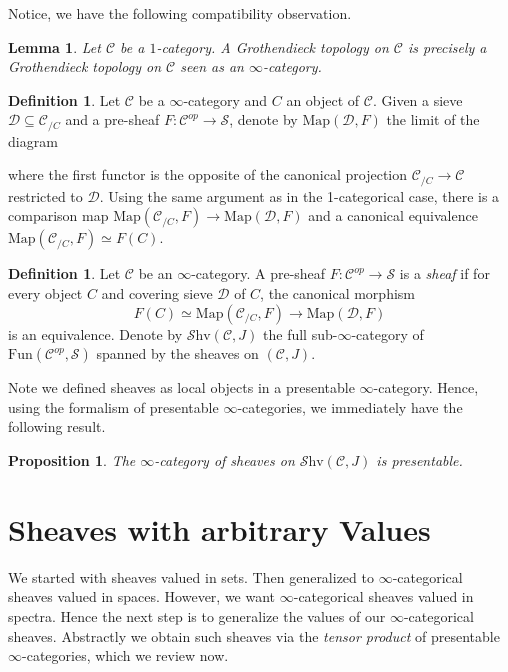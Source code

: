 \documentclass[10pt]{amsart}
\newcommand{\C}{\mathscr{C}}
\newcommand{\D}{\mathscr{D}}
\newcommand{\s}{\mathscr{S}}
\newcommand{\Map}{\mathrm{Map}}
\newcommand{\Fun}{\mathrm{Fun}}
\newcommand{\Shv}{\mathscr{S}\mathrm{hv}}
\newtheorem{lemma}[equation]{Lemma}
\newtheorem{proposition}[equation]{Proposition}
\theoremstyle{definition}
\newtheorem{definition}[equation]{Definition}
\theoremstyle{remark}
\numberwithin{equation}{section}
\begin{document}
	Notice, we have the following compatibility observation.
	\begin{lemma}
		Let $\C$ be a $1$-category. A Grothendieck topology on $\C$ is precisely a Grothendieck topology on $\C$ seen as an $\infty$-category.
	\end{lemma}
	\begin{definition}
		Let $\C$ be a $\infty$-category and $C$ an object of $\C$. Given a sieve $\D\subseteq\C_{/C}$ and a pre-sheaf $F:\C^{op}\to\s$, denote by $\Map(\D,F)$ the limit of the diagram \begin{center}
	\end{center}where the first functor is the opposite of the canonical projection $\C_{/C}\to\C$ restricted to $\D$. Using the same argument as in the 1-categorical case, there is a comparison map $\Map(\C_{/C},F)\to\Map(\D,F)$ and a canonical equivalence $\Map(\C_{/C},F)\simeq F(C)$. 
	\end{definition}
	\begin{definition}
		Let $\C$ be an $\infty$-category. A pre-sheaf $F\colon\C^{op}\to\s$ is a \emph{sheaf} if for every object $C$ and covering sieve $\D$ of $C$, the canonical morphism
		\[ F(C)\simeq\Map(\C_{/C},F) \to \Map(\D,F) \]
		is an equivalence. Denote by $\Shv(\C,J)$ the full sub-$\infty$-category of $\Fun(\C^{op},\s)$ spanned by the sheaves on $(\C,J)$.
	\end{definition}
	
	Note we defined sheaves as local objects in a presentable $\infty$-category. Hence, using the formalism of presentable $\infty$-categories, we immediately have the following result. 
	
	\begin{proposition}
		The $\infty$-category of sheaves on $\Shv(\C,J)$ is presentable.
	\end{proposition}
	
\section{Sheaves with arbitrary Values}
We started with sheaves valued in sets. Then generalized to $\infty$-categorical sheaves valued in spaces. However, we want $\infty$-categorical sheaves valued in spectra. Hence the next step is to generalize the values of our $\infty$-categorical sheaves. Abstractly we obtain such sheaves via the \emph{tensor product} of presentable $\infty$-categories, which we review now.
\end{document}
